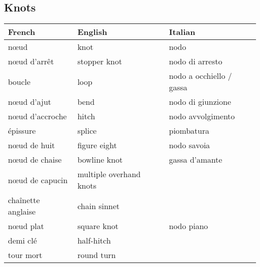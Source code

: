 \documentclass[a4paper, 12pt, twoside]{article}
\begin{document}
    \begin{indt}{\section{Knots}} %
        \begin{tabular}{|l|l|l|}
            \hline %
            \textbf{French}
            & \textbf{English}
            & \textbf{Italian}
            \\
            \hline
            \hline %
            n\oe ud %
            & knot
            & nodo
            \\
            \hline %
            n\oe ud d'arrêt %
            & stopper knot
            & nodo di arresto
            \\
            \hline %
            boucle %
            & loop
            & nodo a occhiello / gassa
            \\
            \hline %
            n\oe ud d'ajut %
            & bend
            & nodo di giunzione
            \\
            \hline %
            n\oe ud d'accroche %
            & hitch
            & nodo avvolgimento
            \\
            \hline %
            épissure %
            & splice
            & piombatura
            \\
            \hline %
            n\oe ud de huit %
            & figure eight
            & nodo savoia
            \\
            \hline %
            n\oe ud de chaise %
            & bowline knot
            & gassa d'amante
            \\
            \hline %
            n\oe ud de capucin %
            & multiple overhand knots
            &
            \\
            \hline %
            chaînette anglaise %
            & chain sinnet
            &
            \\
            \hline %
            n\oe ud plat %
            & square knot
            & nodo piano
            \\
            \hline %
            demi clé %
            & half-hitch
            &
            \\
            \hline %
            tour mort %
            & round turn
            &
            \\

\end{tabular}
\end{indt}
\end{document}
